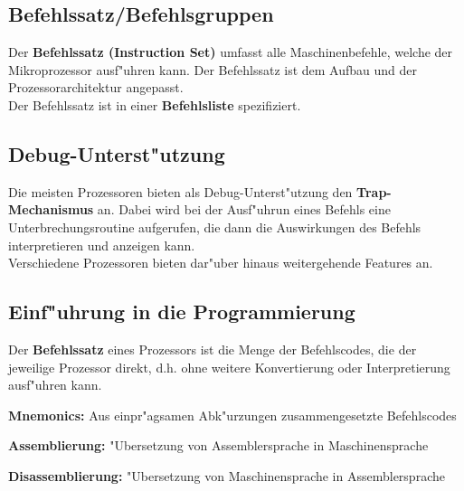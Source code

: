 \subsection{Befehlssatz/Befehlsgruppen}
Der \textbf{Befehlssatz (Instruction Set)} umfasst alle Maschinenbefehle, welche der Mikroprozessor ausf"uhren kann. Der Befehlssatz ist dem Aufbau und der Prozessorarchitektur angepasst.\\
Der Befehlssatz ist in einer \textbf{Befehlsliste} spezifiziert.

\subsection{Debug-Unterst"utzung}
Die meisten Prozessoren bieten als Debug-Unterst"utzung den \textbf{Trap-Mechanismus} an. Dabei wird bei der Ausf"uhrun eines Befehls eine Unterbrechungsroutine aufgerufen, die dann die Auswirkungen des Befehls interpretieren und anzeigen kann.\\
Verschiedene Prozessoren bieten dar"uber hinaus weitergehende Features an.

\subsection{Einf"uhrung in die Programmierung}
Der \textbf{Befehlssatz} eines Prozessors ist die Menge der Befehlscodes, die der jeweilige Prozessor direkt, d.h. ohne weitere Konvertierung oder Interpretierung ausf"uhren kann.

\textbf{Mnemonics:} Aus einpr"agsamen Abk"urzungen zusammengesetzte Befehlscodes

\textbf{Assemblierung:} "Ubersetzung von Assemblersprache in Maschinensprache 

\textbf{Disassemblierung:} "Ubersetzung von Maschinensprache in Assemblersprache 


